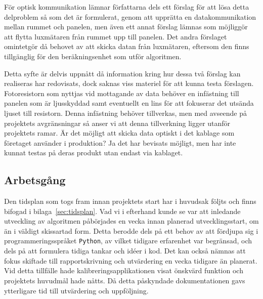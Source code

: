         För optisk kommunikation lämnar författarna dels ett förslag för att lösa detta delproblem så som det är formulerat, genom att upprätta en datakommunikation mellan rummet och panelen, men även ett annat förslag lämnas som möjliggör att flytta luxmätaren från rummet upp till panelen. Det andra förslaget omintetgör då behovet av att skicka datan från luxmätaren, eftersom den finns tillgänglig för den beräkningsenhet som utför algoritmen.\bigskip

        Detta syfte är delvis uppnått då information kring hur dessa två förslag kan realiseras har redovisats, dock saknas viss materiel för att kunna testa förslagen. Fotoresistorn som nyttjas vid mottagande av data behöver en infästning till panelen som är ljusskyddad samt eventuellt en lins för att fokuserar det utsända ljuset till resistorn. Denna infästning behöver tillverkas, men med avseende på projektets avgränsningar så anser vi att denna tillverkning ligger utanför projektets ramar. Är det möjligt att skicka data optiskt i det kablage som företaget använder i produktion? Ja det har bevisats möjligt, men har inte kunnat testas på deras produkt utan endast via kablaget.

    \subsection{Arbetsgång} %
    \label{sub:arbetsg_ng}
        Den tidsplan som togs fram innan projektets start har i huvudsak följts och finns bifogad i bilaga~\ref{sec:tidsplan}. Vad vi i efterhand kunde se var att inledande utveckling av algoritmen påbörjades en vecka innan planerad utvecklingsstart, om än i väldigt skissartad form. Detta berodde dels på ett behov av att fördjupa sig i programmeringsspråket \texttt{Python}, av vilket tidigare erfarenhet var begränsad, och dels på att formulera tidiga tankar och idéer i kod. Det kan också nämnas att fokus skiftade till rapportskrivning och utvärdering en vecka tidigare än planerat. Vid detta tillfälle hade kalibreringsapplikationen visat önskvärd funktion och projektets huvudmål hade nåtts. Då detta påskyndade dokumentationen gavs ytterligare tid till utvärdering och uppföljning.\bigskip

